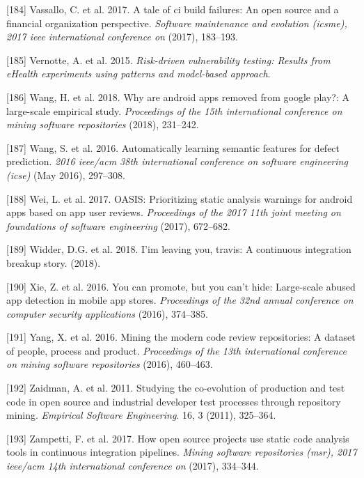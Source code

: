 \documentclass[]{book}
\begin{document}
\hypertarget{ref-vassallo2017tale}{}
{[}184{]} Vassallo, C. et al. 2017. A tale of ci build failures: An open
source and a financial organization perspective. \emph{Software
maintenance and evolution (icsme), 2017 ieee international conference
on} (2017), 183--193.

\hypertarget{ref-vernotte2015}{}
{[}185{]} Vernotte, A. et al. 2015. \emph{Risk-driven vulnerability
testing: Results from eHealth experiments using patterns and model-based
approach}.

\hypertarget{ref-wang2018android}{}
{[}186{]} Wang, H. et al. 2018. Why are android apps removed from google
play?: A large-scale empirical study. \emph{Proceedings of the 15th
international conference on mining software repositories} (2018),
231--242.

\hypertarget{ref-wang2016}{}
{[}187{]} Wang, S. et al. 2016. Automatically learning semantic features
for defect prediction. \emph{2016 ieee/acm 38th international conference
on software engineering (icse)} (May 2016), 297--308.

\hypertarget{ref-wei2017oasis}{}
{[}188{]} Wei, L. et al. 2017. OASIS: Prioritizing static analysis
warnings for android apps based on app user reviews. \emph{Proceedings
of the 2017 11th joint meeting on foundations of software engineering}
(2017), 672--682.

\hypertarget{ref-widder2018m}{}
{[}189{]} Widder, D.G. et al. 2018. I'im leaving you, travis: A
continuous integration breakup story. (2018).

\hypertarget{ref-xie2016you}{}
{[}190{]} Xie, Z. et al. 2016. You can promote, but you can't hide:
Large-scale abused app detection in mobile app stores. \emph{Proceedings
of the 32nd annual conference on computer security applications} (2016),
374--385.

\hypertarget{ref-yang2016mining}{}
{[}191{]} Yang, X. et al. 2016. Mining the modern code review
repositories: A dataset of people, process and product.
\emph{Proceedings of the 13th international conference on mining
software repositories} (2016), 460--463.

\hypertarget{ref-zaidman2011studying}{}
{[}192{]} Zaidman, A. et al. 2011. Studying the co-evolution of
production and test code in open source and industrial developer test
processes through repository mining. \emph{Empirical Software
Engineering}. 16, 3 (2011), 325--364.

\hypertarget{ref-zampetti2017open}{}
{[}193{]} Zampetti, F. et al. 2017. How open source projects use static
code analysis tools in continuous integration pipelines. \emph{Mining
software repositories (msr), 2017 ieee/acm 14th international conference
on} (2017), 334--344.
\end{document}
